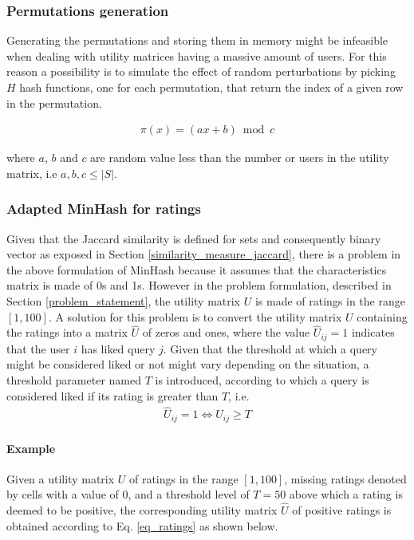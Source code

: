 \subsubsection{Permutations generation} Generating the permutations and storing them in memory might be infeasible when dealing with utility matrices having a massive amount of users. For this reason a possibility is to simulate the effect of random perturbations by picking $H$ hash functions, one for each permutation, that return the index of a given row in the permutation. 

\begin{equation}
\begin{aligned}
\pi(x) = (ax + b) \bmod c
\end{aligned}
\end{equation}

where $a$, $b$ and $c$ are random value less than the number or users in the utility matrix, i.e $a, b, c \leq |S|$.

\subsubsection{Adapted MinHash for ratings} Given that the Jaccard similarity is defined for sets and consequently binary vector as exposed in Section \ref{similarity_measure_jaccard}, there is a problem in the above formulation of MinHash because it assumes that the characteristics matrix is made of 0s and 1s. However in the problem formulation, described in Section \ref{problem_statement}, the utility matrix $U$ is made of ratings in the range $[1,100]$. A solution for this problem is to convert the utility matrix $U$ containing the ratings into a matrix $\widehat{U}$ of zeros and ones, where the value $\widehat{U}_{ij} = 1$ indicates that the user $i$ has liked query $j$. Given that the threshold at which a query might be considered liked or not might vary depending on the situation, a threshold parameter named $T$ is introduced, according to which a query is considered liked if its rating is greater than $T$, i.e. 
\begin{equation}
\begin{aligned}
\widehat{U}_{ij} = 1 \iff U_{ij} \geq T
\end{aligned}
\label{eq_ratings}
\end{equation}
 
\paragraph{Example} Given a utility matrix $U$ of ratings in the range $[1,100]$, missing ratings denoted by cells with a value of $0$, and a threshold level of $T=50$ above which a rating is deemed to be positive, the corresponding utility matrix $\widehat{U}$ of positive ratings is obtained according to Eq. \ref{eq_ratings} as shown below. 

